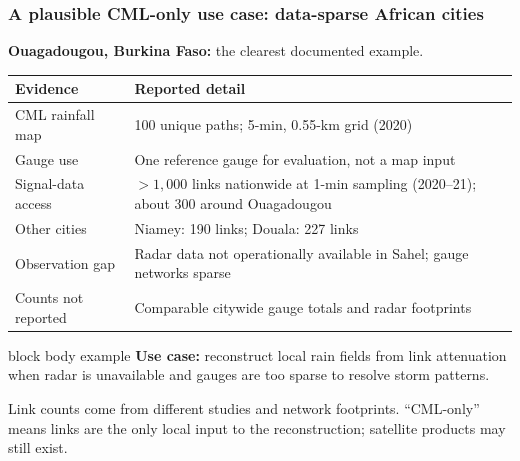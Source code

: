 \documentclass[aspectratio=169]{beamer}
\newcommand{\slidetitle}[1]{\frametitle{#1}}
\begin{document}
\begin{frame}[t]
\slidetitle{A plausible CML-only use case: data-sparse African cities}
\small
\textbf{Ouagadougou, Burkina Faso:} the clearest documented example.
\vspace{1mm}
\begin{table}
\centering
\renewcommand{\arraystretch}{1.25}
\begin{tabular}{p{}p{}}
\toprule
\textbf{Evidence} & \textbf{Reported detail}\\
\midrule
CML rainfall map & 100 unique paths; 5-min, 0.55-km grid (2020)\\
Gauge use & One reference gauge for evaluation, not a map input\\
Signal-data access & $>1{,}000$ links nationwide at 1-min sampling (2020--21); about 300 around Ouagadougou\\
Other cities & Niamey: 190 links; Douala: 227 links\\
Observation gap & Radar data not operationally available in Sahel; gauge networks sparse\\
Counts not reported & Comparable citywide gauge totals and radar footprints\\
\bottomrule
\end{tabular}
\end{table}
\vspace{-1mm}
\begin{beamercolorbox}[rounded=true,sep=1ex,wd=\textwidth]{block body example}
\centering
\textbf{Use case:} reconstruct local rain fields from link attenuation when radar is unavailable and gauges are too sparse to resolve storm patterns.
\end{beamercolorbox}
\vspace{1mm}
\scriptsize Link counts come from different studies and network footprints. ``CML-only'' means links are the only local input to the reconstruction; satellite products may still exist.

\end{frame}
\end{document}
